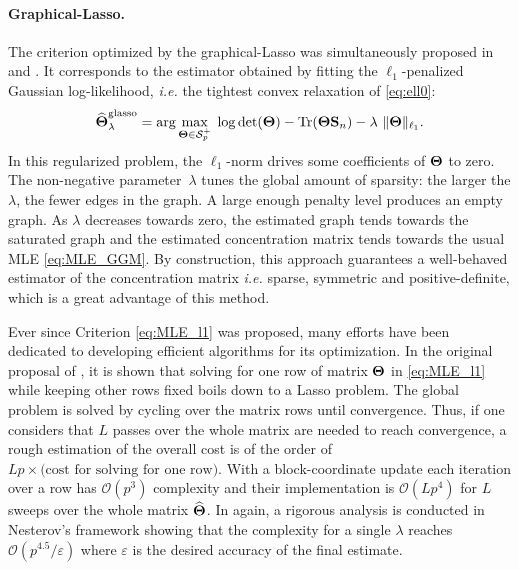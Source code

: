 \paragraph*{Graphical-Lasso.}    The   criterion  optimized   by   the
graphical-Lasso       was       simultaneously       proposed       in
\cite{2007_Biometrika_Yuan}    and   \cite{2008_JMLR_Banerjee}.     It
corresponds    to   the    estimator   obtained    by   fitting    the
$\ell_1$-penalized Gaussian  log-likelihood, \emph{i.e.}  the tightest
convex relaxation of \eqref{eq:ell0}:
\begin{equation}
  \label{eq:MLE_l1}
  \widehat{\invcov}^{\text{glasso}}_\lambda = \arg \max_{\invcov \in \mathcal{S}^+_p} \; \log
  \det(\invcov) - \trace(\invcov \empcov) -
  \lambda\ \|\invcov\|_{\ell_1}.
\end{equation}
In   this  regularized   problem,   the   $\ell_1$-norm  drives   some
coefficients    of    $\boldsymbol\Theta$    to    zero.     The    non-negative
parameter~$\lambda$ tunes  the global  amount of sparsity:  the larger
the $\lambda$,  the fewer edges in  the graph. A large  enough penalty
level produces an  empty graph.  As $\lambda$  decreases towards zero,
the  estimated  graph  tends  towards  the  saturated  graph  and  the
estimated   concentration  matrix   tends   towards   the  usual   MLE
\eqref{eq:MLE_GGM}.   By  construction,  this  approach  guarantees  a
well-behaved  estimator   of  the  concentration   matrix  \emph{i.e.}
sparse, symmetric and positive-definite, which is a great advantage of
this method.

Ever since Criterion \eqref{eq:MLE_l1} was proposed, many efforts have
been   dedicated   to   developing  efficient   algorithms   for   its
optimization. In  the original proposal  of \cite{2008_JMLR_Banerjee},
it  is  shown  that  solving  for  one  row  of  matrix  $\boldsymbol\Theta$  in
\eqref{eq:MLE_l1} while keeping other rows fixed boils down to a Lasso
problem.  The global problem is solved by cycling over the matrix rows
until convergence.   Thus, if one  considers that $L$ passes  over the
whole matrix  are needed to  reach convergence, a rough  estimation of
the  overall cost  is of  the  order of  $L p  \times \text{(cost  for
  solving  for  one  row)}$.   With  a  block-coordinate  update  each
iteration  over  a row  has  $\mathcal{O}(p^3)$  complexity and  their
implementation is $\mathcal{O}(L  p^4)$ for $L$ sweeps  over the whole
matrix  $\widehat{\boldsymbol\Theta}$.   In \cite{2008_JMLR_Banerjee}  again,  a
rigorous    analysis   is    conducted    in   Nesterov's    framework
\cite{nesterov2005smooth}  showing that  the complexity  for a  single
$\lambda$     reaches     $\mathcal{O}(p^{4.5}/\varepsilon)$     where
$\varepsilon$ is the desired accuracy of the final estimate.

